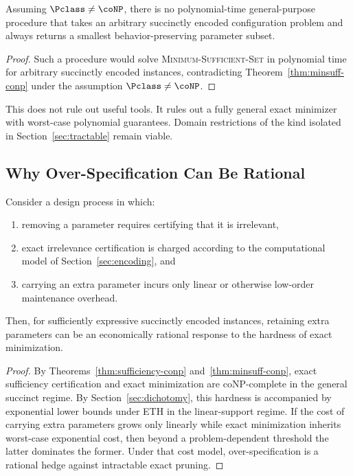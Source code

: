 \begin{corollary}
\label{cor:no-general-minimizer}
Assuming $\Pclass \neq \coNP$, there is no polynomial-time general-purpose procedure that takes an arbitrary succinctly encoded configuration problem and always returns a smallest behavior-preserving parameter subset.
\end{corollary}

\begin{proof}
Such a procedure would solve \textsc{Minimum-Sufficient-Set} in polynomial time for arbitrary succinctly encoded instances, contradicting Theorem~\ref{thm:minsuff-conp} under the assumption $\Pclass \neq \coNP$.
\end{proof}

\begin{remark}
This does not rule out useful tools. It rules out a fully general exact minimizer with worst-case polynomial guarantees. Domain restrictions of the kind isolated in Section~\ref{sec:tractable} remain viable.
\end{remark}

\subsection{Why Over-Specification Can Be Rational}

\begin{proposition}
\label{prop:rational-overspecification}
Consider a design process in which:
\begin{enumerate}
\item removing a parameter requires certifying that it is irrelevant,
\item exact irrelevance certification is charged according to the computational model of Section~\ref{sec:encoding}, and
\item carrying an extra parameter incurs only linear or otherwise low-order maintenance overhead.
\end{enumerate}
Then, for sufficiently expressive succinctly encoded instances, retaining extra parameters can be an economically rational response to the hardness of exact minimization.
\end{proposition}

\begin{proof}
By Theorems~\ref{thm:sufficiency-conp} and~\ref{thm:minsuff-conp}, exact sufficiency certification and exact minimization are coNP-complete in the general succinct regime. By Section~\ref{sec:dichotomy}, this hardness is accompanied by exponential lower bounds under ETH in the linear-support regime. If the cost of carrying extra parameters grows only linearly while exact minimization inherits worst-case exponential cost, then beyond a problem-dependent threshold the latter dominates the former. Under that cost model, over-specification is a rational hedge against intractable exact pruning.
\end{proof}


